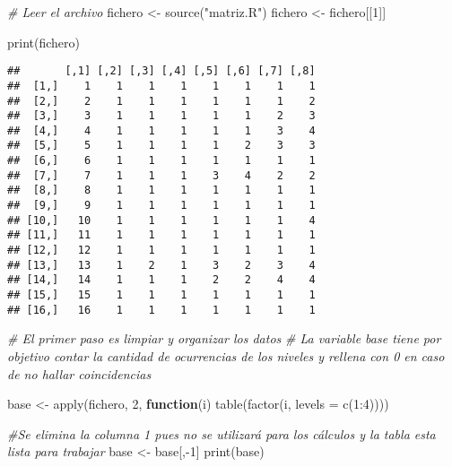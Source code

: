 \documentclass[
  12pt,
]{article}
\newenvironment{Shaded}{\begin{snugshade}}{\end{snugshade}}
\newcommand{\AttributeTok}[1]{\textcolor[rgb]{0.77,0.63,0.00}{#1}}
\newcommand{\CommentTok}[1]{\textcolor[rgb]{0.56,0.35,0.01}{\textit{#1}}}
\newcommand{\ControlFlowTok}[1]{\textcolor[rgb]{0.13,0.29,0.53}{\textbf{#1}}}
\newcommand{\DecValTok}[1]{\textcolor[rgb]{0.00,0.00,0.81}{#1}}
\newcommand{\FunctionTok}[1]{\textcolor[rgb]{0.00,0.00,0.00}{#1}}
\newcommand{\NormalTok}[1]{#1}
\newcommand{\OtherTok}[1]{\textcolor[rgb]{0.56,0.35,0.01}{#1}}
\newcommand{\SpecialCharTok}[1]{\textcolor[rgb]{0.00,0.00,0.00}{#1}}
\newcommand{\StringTok}[1]{\textcolor[rgb]{0.31,0.60,0.02}{#1}}
\begin{document}
\begin{Shaded}
\begin{Highlighting}[]
\CommentTok{\# Leer el archivo }
\NormalTok{fichero }\OtherTok{\textless{}{-}} \FunctionTok{source}\NormalTok{(}\StringTok{"matriz.R"}\NormalTok{)}
\NormalTok{fichero }\OtherTok{\textless{}{-}}\NormalTok{ fichero[[}\DecValTok{1}\NormalTok{]]}

\FunctionTok{print}\NormalTok{(fichero)}
\end{Highlighting}
\end{Shaded}

\begin{verbatim}
##       [,1] [,2] [,3] [,4] [,5] [,6] [,7] [,8]
##  [1,]    1    1    1    1    1    1    1    1
##  [2,]    2    1    1    1    1    1    1    2
##  [3,]    3    1    1    1    1    1    2    3
##  [4,]    4    1    1    1    1    1    3    4
##  [5,]    5    1    1    1    1    2    3    3
##  [6,]    6    1    1    1    1    1    1    1
##  [7,]    7    1    1    1    3    4    2    2
##  [8,]    8    1    1    1    1    1    1    1
##  [9,]    9    1    1    1    1    1    1    1
## [10,]   10    1    1    1    1    1    1    4
## [11,]   11    1    1    1    1    1    1    1
## [12,]   12    1    1    1    1    1    1    1
## [13,]   13    1    2    1    3    2    3    4
## [14,]   14    1    1    1    2    2    4    4
## [15,]   15    1    1    1    1    1    1    1
## [16,]   16    1    1    1    1    1    1    1
\end{verbatim}

\begin{Shaded}
\begin{Highlighting}[]
\CommentTok{\# El primer paso es limpiar y organizar los datos}
\CommentTok{\# La variable base tiene por objetivo contar la cantidad de ocurrencias de los niveles y rellena con 0 en caso de no hallar coincidencias}

\NormalTok{base }\OtherTok{\textless{}{-}} \FunctionTok{apply}\NormalTok{(fichero, }\DecValTok{2}\NormalTok{, }\ControlFlowTok{function}\NormalTok{(i) }\FunctionTok{table}\NormalTok{(}\FunctionTok{factor}\NormalTok{(i, }\AttributeTok{levels =} \FunctionTok{c}\NormalTok{(}\DecValTok{1}\SpecialCharTok{:}\DecValTok{4}\NormalTok{))))}

\CommentTok{\#Se elimina la columna 1 pues no se utilizará para los cálculos y la tabla esta lista para trabajar}
\NormalTok{base }\OtherTok{\textless{}{-}}\NormalTok{ base[,}\SpecialCharTok{{-}}\DecValTok{1}\NormalTok{] }
\FunctionTok{print}\NormalTok{(base)}
\end{Highlighting}
\end{Shaded}
\end{document}
